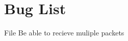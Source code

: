 \chapter{Bug List}
\hypertarget{bug}{}\label{bug}

\begin{DoxyRefList}
\item[File \doxylink{receiver_8c}{receiver.c} ]\label{bug__bug000001}%
%
Be able to recieve muliple packets
\end{DoxyRefList}